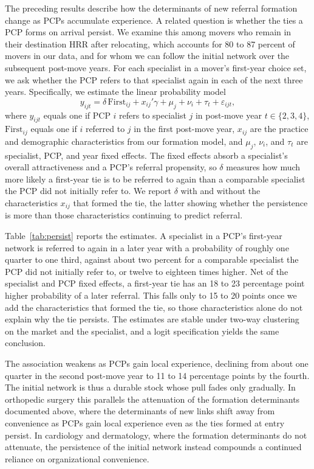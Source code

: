 \documentclass[12pt]{article}
\begin{document}
The preceding results describe how the determinants of new referral formation change as PCPs accumulate experience. A related question is whether the ties a PCP forms on arrival persist. We examine this among movers who remain in their destination HRR after relocating, which accounts for 80 to 87 percent of movers in our data, and for whom we can follow the initial network over the subsequent post-move years. For each specialist in a mover's first-year choice set, we ask whether the PCP refers to that specialist again in each of the next three years. Specifically, we estimate the linear probability model $$ y_{ijt} = \delta\,\mathrm{First}_{ij} + x_{ij}'\gamma + \mu_j + \nu_i + \tau_t + \varepsilon_{ijt}, $$ where $y_{ijt}$ equals one if PCP $i$ refers to specialist $j$ in post-move year $t \in \{2,3,4\}$, $\mathrm{First}_{ij}$ equals one if $i$ referred to $j$ in the first post-move year, $x_{ij}$ are the practice and demographic characteristics from our formation model, and $\mu_j$, $\nu_i$, and $\tau_t$ are specialist, PCP, and year fixed effects. The fixed effects absorb a specialist's overall attractiveness and a PCP's referral propensity, so $\delta$ measures how much more likely a first-year tie is to be referred to again than a comparable specialist the PCP did not initially refer to. We report $\delta$ with and without the characteristics $x_{ij}$ that formed the tie, the latter showing whether the persistence is more than those characteristics continuing to predict referral.

Table~\ref{tab:persist} reports the estimates. A specialist in a PCP's first-year network is referred to again in a later year with a probability of roughly one quarter to one third, against about two percent for a comparable specialist the PCP did not initially refer to, or twelve to eighteen times higher. Net of the specialist and PCP fixed effects, a first-year tie has an 18 to 23 percentage point higher probability of a later referral. This falls only to 15 to 20 points once we add the characteristics that formed the tie, so those characteristics alone do not explain why the tie persists. The estimates are stable under two-way clustering on the market and the specialist, and a logit specification yields the same conclusion.

The association weakens as PCPs gain local experience, declining from about one quarter in the second post-move year to 11 to 14 percentage points by the fourth. The initial network is thus a durable stock whose pull fades only gradually. In orthopedic surgery this parallels the attenuation of the formation determinants documented above, where the determinants of new links shift away from convenience as PCPs gain local experience even as the ties formed at entry persist. In cardiology and dermatology, where the formation determinants do not attenuate, the persistence of the initial network instead compounds a continued reliance on organizational convenience.
\end{document}
